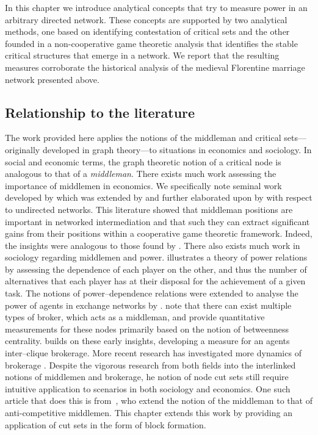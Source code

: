 In this chapter we introduce analytical concepts that try to measure power in an arbitrary directed network. These concepts are supported by two analytical methods, one based on identifying contestation of critical sets and the other founded in a non-cooperative game theoretic analysis that identifies the stable critical structures that emerge in a network. We report that the resulting measures corroborate the historical analysis of the medieval Florentine marriage network presented above.

\subsection{Relationship to the literature}

The work provided here applies the notions of the middleman and critical sets---originally developed in graph theory---to situations in economics and sociology. In social and economic terms, the graph theoretic notion of a critical node is analogous to that of a \emph{middleman}. There exists much work assessing the importance of middlemen in economics. We specifically note seminal work developed by \citet{KalaiMiddlemen1978} which was extended by \citet{JacksonWolinsky1996} and further elaborated upon by \citet{GillesChakrabarti2006} with respect to undirected networks. This literature showed that middleman positions are important in networked intermediation and that such they can extract significant gains from their positions within a cooperative game theoretic framework. Indeed, the insights were analogous to those found by \citet{RubinsteinWolinsky1987}. There also exists much work in sociology regarding middlemen and power. \citet{Emerson1962} illustrates a theory of power relations by assessing the dependence of each player on the other, and thus the number of alternatives that each player has at their disposal for the achievement of a given task. The notions of power--dependence relations were extended to analyse the power of agents in exchange networks by \citet{CookEmersonGillmoreYamagishi1983}. \citet{GouldFernandez1989} note that there can exist multiple types of broker, which acts as a middleman, and provide quantitative measurements for these nodes primarily based on the notion of betweenness centrality. \citet{Gould1989} builds on these early insights, developing a measure for an agents inter--clique brokerage. More recent research has investigated more dynamics of brokerage \citep{Spiro2013}. Despite the vigorous research from both fields into the interlinked notions of middlemen and brokerage, he notion of node cut sets still require intuitive application to scenarios in both sociology and economics. One such article that does this is from~\citet{SimsGilles2014}, who extend the notion of the middleman to that of anti-competitive middlemen. This chapter extends this work by providing an application of cut sets in the form of block formation.

